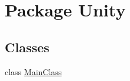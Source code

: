 \hypertarget{namespace_unity}{\section{Package Unity}
\label{namespace_unity}
}
\subsection*{Classes}
\begin{DoxyCompactItemize}
\item 
class \hyperlink{class_unity_1_1_main_class}{Main\+Class}
\end{DoxyCompactItemize}
